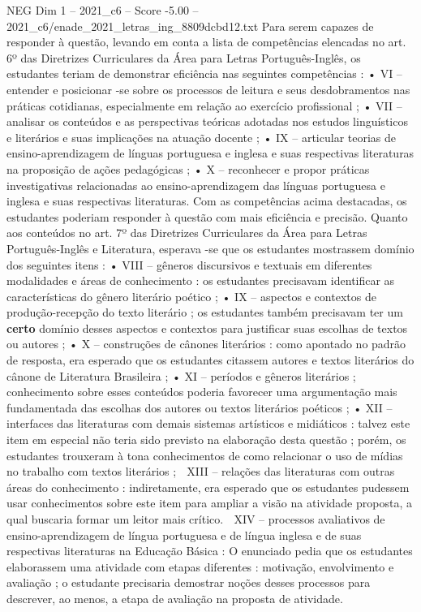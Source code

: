 \begin{textsample}{NEG Dim 1 – 2021\_c6 – Score -5.00 – 2021\_c6/enade\_2021\_letras\_ing\_8809dcbd12.txt}
Para serem capazes de responder à questão, levando em conta a lista de competências elencadas no art. 6º das Diretrizes Curriculares da Área para Letras Português-Inglês, os estudantes teriam de demonstrar eficiência nas seguintes competências : • VI – entender e posicionar -se sobre os processos de leitura e seus desdobramentos nas práticas cotidianas, especialmente em relação ao exercício profissional ; • VII – analisar os conteúdos e as perspectivas teóricas adotadas nos estudos linguísticos e literários e suas implicações na atuação docente ; • IX – articular teorias de ensino-aprendizagem de línguas portuguesa e inglesa e suas respectivas literaturas na proposição de ações pedagógicas ; • X – reconhecer e propor práticas investigativas relacionadas ao ensino-aprendizagem das línguas portuguesa e inglesa e suas respectivas literaturas.
Com as competências acima destacadas, os estudantes poderiam responder à questão com mais eficiência e precisão.
Quanto aos conteúdos no art. 7º das Diretrizes Curriculares da Área para Letras Português-Inglês e Literatura, esperava -se que os estudantes mostrassem domínio dos seguintes itens : • VIII – gêneros discursivos e textuais em diferentes modalidades e áreas de conhecimento : os estudantes precisavam identificar as características do gênero literário poético ; • IX – aspectos e contextos de produção-recepção do texto literário ; os estudantes também precisavam ter um \textbf{certo} domínio desses aspectos e contextos para justificar suas escolhas de textos ou autores ; • X – construções de cânones literários : como apontado no padrão de resposta, era esperado que os estudantes citassem autores e textos literários do cânone de Literatura Brasileira ; • XI – períodos e gêneros literários ; conhecimento sobre esses conteúdos poderia favorecer uma argumentação mais fundamentada das escolhas dos autores ou textos literários poéticos ; • XII – interfaces das literaturas com demais sistemas artísticos e midiáticos : talvez este item em especial não teria sido previsto na elaboração desta questão ; porém, os estudantes trouxeram à tona conhecimentos de como relacionar o uso de mídias no trabalho com textos literários ;  XIII – relações das literaturas com outras áreas do conhecimento : indiretamente, era esperado que os estudantes pudessem usar conhecimentos sobre este item para ampliar a visão na atividade proposta, a qual buscaria formar um leitor mais crítico.  XIV – processos avaliativos de ensino-aprendizagem de língua portuguesa e de língua inglesa e de suas respectivas literaturas na Educação Básica : O enunciado pedia que os estudantes elaborassem uma atividade com etapas diferentes : motivação, envolvimento e avaliação ; o estudante precisaria demostrar noções desses processos para descrever, ao menos, a etapa de avaliação na proposta de atividade.

\end{textsample}
